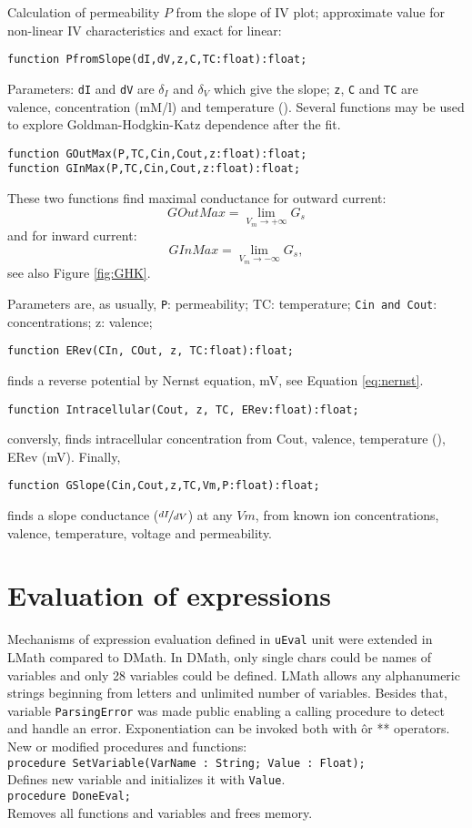 \documentclass[12pt,a4paper,oneside]{article}
\newcommand{\code}[1]{\texttt{#1}}
\begin{document}
Calculation of permeability $P$ from the slope of IV plot; approximate value for non-linear IV characteristics and exact for linear: 
\begin{verbatim}
function PfromSlope(dI,dV,z,C,TC:float):float;
\end{verbatim}
Parameters: \code{dI} and \code{dV} are $\delta_I$ and $\delta_V$ which give the slope; \code{z}, \code{C} and \code{TC} are valence, concentration (mM/l) and temperature (\celsius).
Several functions may be used to explore Goldman-Hodgkin-Katz dependence after the fit.
\begin{verbatim}
function GOutMax(P,TC,Cin,Cout,z:float):float;
function GInMax(P,TC,Cin,Cout,z:float):float; 
\end{verbatim} 
These two functions find maximal conductance for outward current:
$$
GOutMax=\lim_{V_m\rightarrow+\infty}{G_s}
$$
and for inward current:
$$
GInMax=\lim_{V_m\rightarrow-\infty}{G_s},
$$
see also Figure \ref{fig:GHK}.

Parameters are, as usually, \code{P}: permeability; TC: temperature; \code{Cin and Cout}: concentrations; z: valence;
\begin{verbatim}
function ERev(CIn, COut, z, TC:float):float; 
\end{verbatim}
finds a reverse potential by Nernst equation, mV, see Equation \ref{eq:nernst}.
\begin{verbatim}
function Intracellular(Cout, z, TC, ERev:float):float;
\end{verbatim}
conversly, finds intracellular concentration from Cout, valence, temperature (\celsius), ERev (mV).
Finally, 
\begin{verbatim}
function GSlope(Cin,Cout,z,TC,Vm,P:float):float;
\end{verbatim}
finds a slope conductance ($\nicefrac{dI}{dV}$) at any $Vm$, from known ion concentrations, valence, temperature, voltage and permeability.
\section{Evaluation of expressions}
Mechanisms of expression evaluation defined in \code{uEval} unit were extended in LMath compared to DMath. In DMath, only single chars could be names of variables and only 28 variables could be defined. LMath allows any alphanumeric strings beginning from letters and unlimited number of variables. Besides that, variable \code{ParsingError} was made public enabling a calling procedure to detect and handle an error. Exponentiation can be invoked both with \^ or ** operators.
New or modified procedures and functions:\\[2pt]
\code{procedure SetVariable(VarName : String; Value : Float);}\\
Defines new variable and initializes it with \code{Value}.\\[2pt]
\code{procedure DoneEval;}\\
Removes all functions and variables and frees memory.
\end{document}
